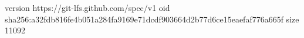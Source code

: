 version https://git-lfs.github.com/spec/v1
oid sha256:a32fdb816fe4b051a284fa9169e71dcdf903664d2b77d6ce15eaefaf776a665f
size 11092
